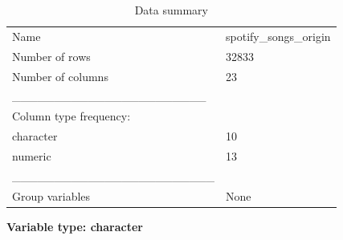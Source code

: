 \documentclass[
]{article}
\begin{document}
\begin{longtable}[]{@{}ll@{}}
\caption{Data summary}\tabularnewline
\toprule()
\endhead
Name & spotify\_songs\_origin \\
Number of rows & 32833 \\
Number of columns & 23 \\
\_\_\_\_\_\_\_\_\_\_\_\_\_\_\_\_\_\_\_\_\_\_\_ & \\
Column type frequency: & \\
character & 10 \\
numeric & 13 \\
\_\_\_\_\_\_\_\_\_\_\_\_\_\_\_\_\_\_\_\_\_\_\_\_ & \\
Group variables & None \\
\bottomrule()
\end{longtable}

\textbf{Variable type: character}
\end{document}
